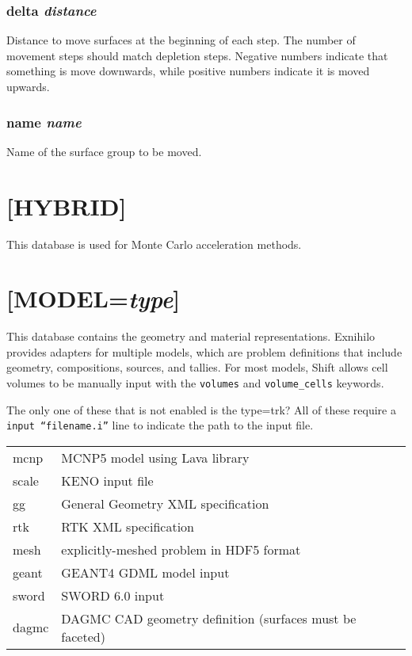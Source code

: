 \documentclass[10pt]{article}
\begin{document}
\subsubsection{delta \textit{distance}}
Distance to move surfaces at the beginning of each step. The number of movement steps should match depletion steps. Negative numbers indicate that something is move downwards, while positive numbers indicate it is moved upwards.

\subsubsection{name \textit{name}}
Name of the surface group to be moved.

\section{[HYBRID]}
This database is used for Monte Carlo acceleration methods.

\section{[MODEL=\textit{type}]}
This database contains the geometry and material representations. Exnihilo provides adapters for multiple models, which are problem definitions that include geometry, compositions, sources, and tallies. For most models, Shift allows cell volumes to be manually input with the \texttt{volumes} and \texttt{volume\_cells} keywords.

The only one of these that is not enabled is the type=trk? All of these require a \texttt{input ``filename.i''} line to indicate the path to the input file.\newline

\begin{tabular}{l l}
mcnp & MCNP5 model using Lava library\\
scale & KENO input file\\
gg & General Geometry XML specification\\
rtk & RTK XML specification\\
mesh & explicitly-meshed problem in HDF5 format\\
geant & GEANT4 GDML model input\\
sword & SWORD 6.0 input\\
dagmc & DAGMC CAD geometry definition (surfaces must be faceted)\\
\end{tabular}\newline
\end{document}
